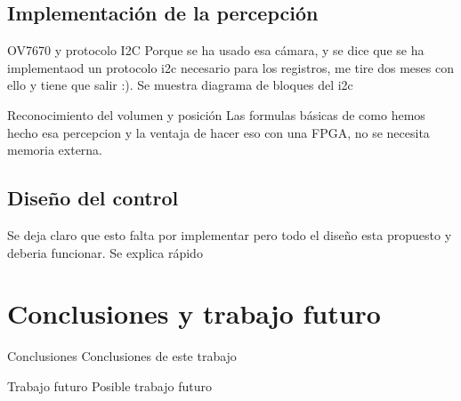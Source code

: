 \documentclass{beamer}
\begin{document}
\subsection{Implementación de la percepción}
\begin{frame}{OV7670 y protocolo I2C}
	Porque se ha usado esa cámara, y se dice que se ha implementaod un protocolo i2c necesario para los registros, me tire dos meses con ello y tiene que salir :). Se muestra diagrama de bloques del i2c
\end{frame}
\begin{frame}{Reconocimiento del volumen y posición}
Las formulas básicas de como hemos hecho esa percepcion y la ventaja de hacer eso con una FPGA, no se necesita memoria externa. 
\end{frame}
\subsection{Diseño del control}
\begin{frame}
Se deja claro que esto falta por implementar pero todo el diseño esta propuesto y deberia funcionar. Se explica rápido
\end{frame}
\section{Conclusiones y trabajo futuro}
\begin{frame}{Conclusiones}
Conclusiones de este trabajo
\end{frame}
\begin{frame}{Trabajo futuro}
Posible trabajo futuro
\end{frame}
\end{document}
